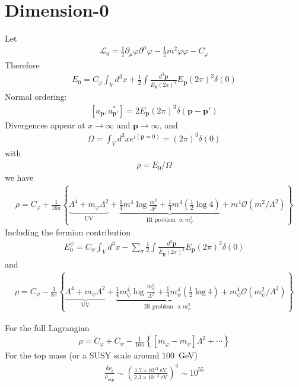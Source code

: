 \documentclass[12pt,letterpaper]{article}
\begin{document}
\section{Dimension-0}
Let
\begin{align*}
  \mathcal{L}_0=\frac{1}{2}\partial_{\mu}\varphi\partial^{\mu}\varphi-\frac{1}{2}m^{2}\varphi\varphi-C_{\varphi}
\end{align*}
Therefore
\begin{align*}
  E_0=C_{\varphi}\int_V d^3x+\frac{1}{2}\int
  \frac{d^3\mathbf{p}}{E_{\mathbf{p}}(2\pi)^3}
E_{\mathbf{p}}(2\pi)^3\delta(0)
\end{align*}
Normal ordering:
\begin{align*}
  \left[ a_{\mathbf{p}},a_{\mathbf{p}'}^{*} \right]=2 E_{\mathbf{p}}
(2\pi)^3\delta(\mathbf{p}-\mathbf{p}')
\end{align*}
Divergences appear at $x\to \infty$ and $\mathbf{p}\to\infty$, and
\begin{align*}
  \Omega=\int_V d^3x e^{i(\mathbf{p}=0)}=(2\pi)^3\delta(0)
\end{align*}
with
\begin{align*}
  \rho=E_0/\Omega
\end{align*}
we have
\begin{align*}
  \rho=C_{\varphi}+\frac{1}{16\pi}\left\{
    \underbrace{\Lambda^4+m_{\varphi}\Lambda^2}_{\text{UV}}+
    \underbrace{\frac{1}{4}m^4\log \frac{m^{2}}{\Lambda^2}
+\frac{1}{4}m^4 \left( \frac{1}{2}\log 4 \right)}_{\text{IR
      problem $\propto m_{\varphi}^{2}$}}+m^4\mathcal{O}\left( m^2/\Lambda^2 \right) \right\}
\end{align*}
Including the fermion contribution
\begin{align*}
  E_0^{\psi}=C_{\psi}\int_V d^3x-\sum_{\sigma}\frac{1}{2}\int
  \frac{d^3\mathbf{p}}{E_{\mathbf{p}}(2\pi)^3}
E_{\mathbf{p}}(2\pi)^3\delta(0)
\end{align*}
and
\begin{align*}
  \rho=C_{\psi}-\frac{1}{8\pi}\left\{
    \underbrace{\Lambda^4+m_{\psi}\Lambda^2}_{\text{UV}}+
    \underbrace{\frac{1}{4}m_\psi^4\log \frac{m_\psi^{2}}{\Lambda^2}
+\frac{1}{4}m_\psi^4 \left( \frac{1}{2}\log 4 \right)}_{\text{IR
      problem $\propto m_{\psi}^{2}$}}+m_\psi^4\mathcal{O}\left( m_\psi^2/\Lambda^2 \right) \right\}
\end{align*}

For the full Lagrangian
\begin{align*}
  \rho=C_{\varphi}+C_{\psi}-\frac{1}{16\pi}\left\{
    [m_{\varphi}-m_{\psi}]\Lambda^2+
\cdots  \right\}
\end{align*}
For the top mass (or a SUSY scale around 100~GeV)
\begin{align*}
  \frac{\delta\rho_t}{\rho_{\text{exp}}}\sim 
  \left( \frac{1.7\times 10^{11}\ \text{eV}}{2.3\times 10^{-3}\
      \text{eV}} \right)^4
       \sim 10^{55}
\end{align*}
\end{document}
